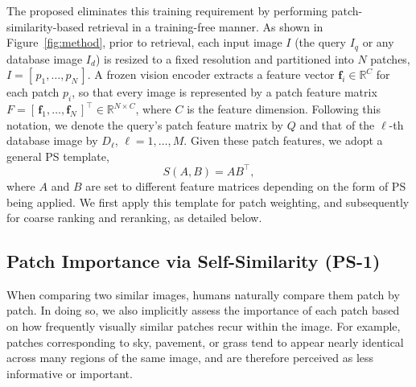 The proposed \method{} eliminates this training requirement by performing patch-similarity-based retrieval in a training-free manner. As shown in Figure~\ref{fig:method}, prior to retrieval, each input image $I$ (the query $I_q$ or any database image $I_d$) is resized to a fixed resolution and partitioned into $N$ patches, $I=[\,p_1,\dots,p_N\,]$. A frozen vision encoder extracts a feature vector $\mathbf f_i\in\mathbb R^{C}$ for each patch $p_i$, so that every image is represented by a patch feature matrix $F=[\,\mathbf f_1,\dots,\mathbf f_N\,]^{\top}\in\mathbb R^{N\times C}$, where $C$ is the feature dimension. Following this notation, we denote the query's patch feature matrix by $Q$ and that of the $\ell$-th database image by $D_\ell$, $\ell=1,\dots,M$. Given these patch features, we adopt a general PS template,
\begin{equation}\label{eq:p2ps}
  S(A,B)=AB^{\top},
\end{equation}
where $A$ and $B$ are set to different feature matrices depending on the form of PS being applied. We first apply this template for patch weighting, and subsequently for coarse ranking and reranking, as detailed below.

\subsection{Patch Importance via Self-Similarity (PS-1)}
\label{sec:feat}
When comparing two similar images, humans naturally compare them patch by patch. In doing so, we also implicitly assess the importance of each patch based on how frequently visually similar patches recur within the image. For example, patches corresponding to sky, pavement, or grass tend to appear nearly identical across many regions of the same image, and are therefore perceived as less informative or important.

